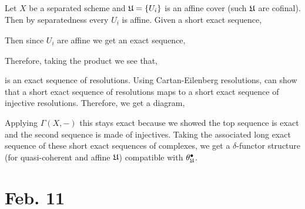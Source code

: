 \documentclass[12pt]{article}
\begin{document}
\begin{example}
Let $X$ be a separated scheme and $\mathfrak{U} = \{ U_i \}$ is an affine cover (such $\mathfrak{U}$ are cofinal). Then by separatedness every $U_{\underline{i}}$ is affine. Given a short exact sequence,
\begin{center}
\end{center}
Then since $U_{\underline{i}}$ are affine we get an exact sequence,
\begin{center}
\end{center}
Therefore, taking the product we see that,
\begin{center}
\end{center}
is an exact sequence of resolutions. Using Cartan-Eilenberg resolutions, can show that a short exact sequence of resolutions maps to a short exact sequence of injective resolutions. Therefore, we get a diagram,
\begin{center}
\end{center}
Applying $\Gamma(X,-)$ this stays exact because we showed the top sequence is exact and the second sequence is made of injectives. Taking the associated long exact sequence of these short exact sequences of complexes, we get a $\delta$-functor structure (for quasi-coherent and affine $\mathfrak{U}$) compatible with $\theta^\bullet_{\mathfrak{U}}$.
\end{example}

\section{Feb. 11}
\end{document}
